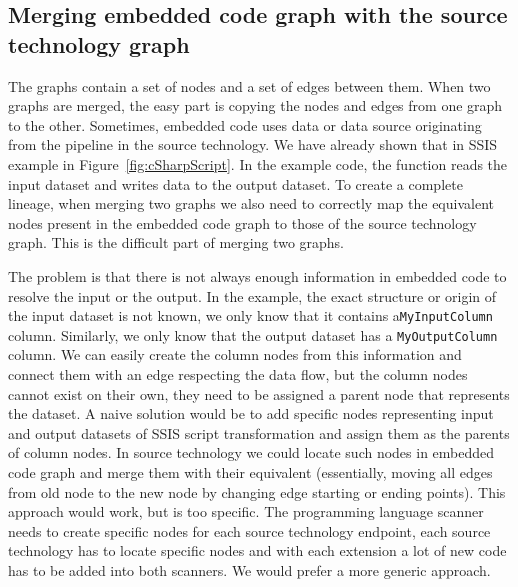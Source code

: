 \subsection{Merging embedded code graph with the source technology graph}
\label{sec:pin}
The graphs contain a set of nodes and a set of edges between them. When two graphs are merged, the easy part is copying the nodes and edges from one graph to the other. Sometimes, embedded code uses data or data source originating from the pipeline in the source technology. We have already shown that in SSIS example in Figure~\ref{fig:cSharpScript}. In the example code, the function reads the input dataset and writes data to the output dataset. To create a complete lineage, when merging two graphs we also need to correctly map the equivalent nodes present in the embedded code graph to those of the source technology graph. This is the difficult part of merging two graphs.
\par
The problem is that there is not always enough information in embedded code to resolve the input or the output. In the example, the exact structure or origin of the input dataset is not known, we only know that it contains a\texttt{MyInputColumn} column. Similarly, we only know that the output dataset has a \texttt{MyOutputColumn} column. We can easily create the column nodes from this information and connect them with an edge respecting the data flow, but the column nodes cannot exist on their own, they need to be assigned a parent node that represents the dataset. A naive solution would be to add specific nodes representing input and output datasets of SSIS script transformation and assign them as the parents of column nodes. In source technology we could locate such nodes in embedded code graph and merge them with their equivalent (essentially, moving all edges from old node to the new node by changing edge starting or ending points). This approach would work, but is too specific. The programming language scanner needs to create specific nodes for each source technology endpoint, each source technology has to locate specific nodes and with each extension a lot of new code has to be added into both scanners. We would prefer a more generic approach.
\par
